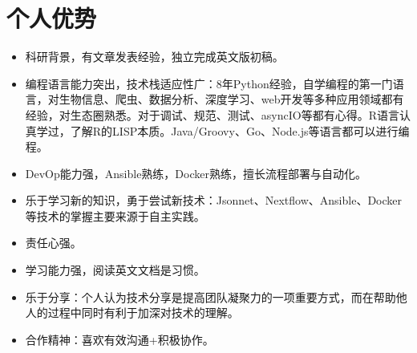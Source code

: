 \documentclass{resume}
\begin{document}
\section{个人优势}
\begin{itemize}[parsep=0.2ex]
  \item 科研背景，有文章发表经验，独立完成英文版初稿\cite{Zhao2015}。
  \item 编程语言能力突出，技术栈适应性广：8年Python经验，自学编程的第一门语言，对生物信息、爬虫、数据分析、深度学习、web开发等多种应用领域都有经验，对生态圈熟悉。对于调试、规范、测试、asyncIO等都有心得。R语言认真学过，了解R的LISP本质。Java/Groovy、Go、Node.js等语言都可以进行编程。
  \item DevOp能力强，Ansible熟练，Docker熟练，擅长流程部署与自动化。
  \item 乐于学习新的知识，勇于尝试新技术：Jsonnet、Nextflow、Ansible、Docker等技术的掌握主要来源于自主实践。
  \item 责任心强。
  \item 学习能力强，阅读英文文档是习惯。
  \item 乐于分享：个人认为技术分享是提高团队凝聚力的一项重要方式，而在帮助他人的过程中同时有利于加深对技术的理解。
  \item 合作精神：喜欢有效沟通+积极协作。

\end{itemize}


\renewcommand\refname{发表文章}

\end{document}
